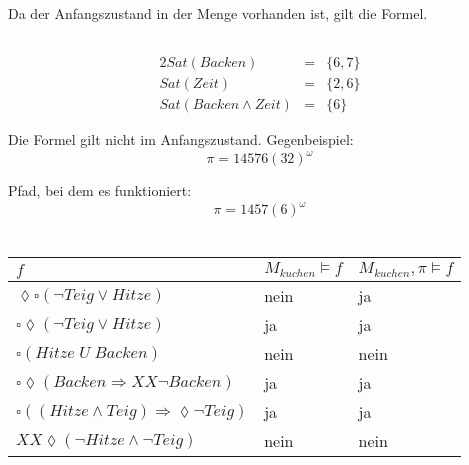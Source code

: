 \documentclass[10pt,a4paper,oneside,ngerman,numbers=noenddot]{scrartcl}
\begin{document}
	Da der Anfangszustand in der Menge vorhanden ist, gilt die Formel.
	
	\subsection{} %
	\begin{alignat*}{2}
		Sat(Backen) &=& \{6,7\} \\
		Sat(Zeit) &=& \{2,6\} \\
		Sat(Backen \wedge Zeit) &=& \{6\}
	\end{alignat*}
	
	Die Formel gilt nicht im Anfangszustand. Gegenbeispiel:
	\[
		\pi = 14576(32)^{\omega}
	\]
	
	Pfad, bei dem es funktioniert:
	\[
		\pi = 1457(6)^{\omega}
	\]
	
\section{} %
	\begin{tabular}{l|l|l}
		\(f\) & \(M_{kuchen} \models f \) & \(M_{kuchen}, \pi \models f\)\\
		\hline
		\(\lozenge \square(\lnot Teig \vee Hitze) \)& nein & ja \\
		\(\square	\lozenge(\lnot Teig \vee Hitze)\) & ja & ja \\
		\(\square	(Hitze \;U\; Backen)\) & nein & nein \\
		\(\square	\lozenge (Backen \Rightarrow XX\lnot Backen)\) & ja & ja \\
		\(\square ((Hitze \wedge Teig) \Rightarrow \lozenge \lnot Teig)\) & ja & ja \\
		\(XX \lozenge (\lnot Hitze \wedge \lnot Teig)\) & nein & nein  
	\end{tabular}
\end{document}
